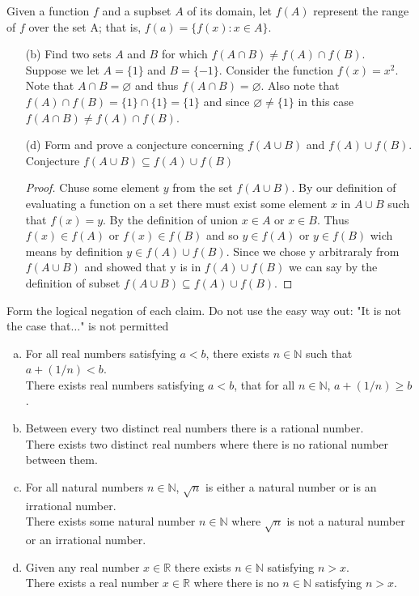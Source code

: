 \documentclass[12pt]{article}
\makeatletter
\theoremstyle{homework}
\newenvironment{exercise}[1]
{\def\@currentlabel{#1}\exercisecore}
{\endexercisecore}
\newcommand{\Reals}{\ensuremath{\mathbb R}}
\newcommand{\Nats}{\ensuremath{\mathbb N}}
\makeatother
\begin{document}
\begin{exercise}{1.2.6(b), (d)}
Given a function $f$ and a supbset $A$ of its domain, let $f(A)$ represent the range of $f$ over the set A;
that is, $f(a)=\{f(x):x\in A\}$.
\end{exercise}
\begin{enumerate}
\item[(b)] Find two sets $A$ and $B$ for which $f(A\cap B) \neq f(A)\cap f(B)$.\\
Suppose we let $A=\{1\}$ and $B=\{-1\}$.  Consider the function $f(x)=x^2$.  Note that $A\cap B=\varnothing$ and thus $f(A\cap B)=\varnothing$.  Also note that $f(A)\cap f(B)=\{1\}\cap \{1\}=\{1\}$ and since $\varnothing \neq \{1\}$ in this case $f(A\cap B) \neq f(A)\cap f(B)$.
\item[(d)] Form and prove a conjecture concerning $f(A\cup B)$ and $f(A)\cup f(B)$.\\
Conjecture $f(A\cup B) \subseteq f(A)\cup f(B)$
\begin{proof}
Chuse some element $y$ from the set $f(A\cup B)$.  By our definition of evaluating a function on a set there must exist some element $x$ in $A\cup B$ such that $f(x)=y$.  By the definition of union $x\in A$ or $x\in B$.  Thus $f(x)\in f(A)$ or $f(x)\in f(B)$ and so $y\in f(A)$ or $y\in f(B)$ wich means by definition $y\in f(A)\cup f(B)$.  Since we chose y arbitraraly from $f(A\cup B)$ and showed that y is in $f(A)\cup f(B)$ we can say by the definition of subset $f(A\cup B) \subseteq f(A)\cup f(B)$.
\end{proof}
\end{enumerate}

\begin{exercise}{1.2.8}
Form the logical negation of each claim. Do not use the easy way out: "It is not the case that$\ldots$" 
is not permitted
\begin{enumerate}[(a)]
\item For all real numbers satisfying $a<b$, there exists $n\in\Nats$ such that $a+(1/n)<b$.\\
There exists real numbers satisfying $a<b$, that for all $n\in\Nats$,  $a+(1/n)\ge b$.
\item Between every two distinct real numbers there is a rational number.\\
There exists two distinct real numbers where there is no rational number between them.
\item For all natural numbers $n\in\Nats$, $\sqrt{n}$ is either a natural number or is an
irrational number.\\
There exists some natural number $n\in\Nats$ where $\sqrt{n}$ is not a natural number or an
irrational number.
\item Given any real number $x\in\Reals$ there exists $n\in\Nats$ satisfying $n>x$.\\
There exists a real number $x\in\Reals$ where there is no $n\in\Nats$ satisfying $n>x$.
\end{enumerate}
\end{exercise}
\end{document}
